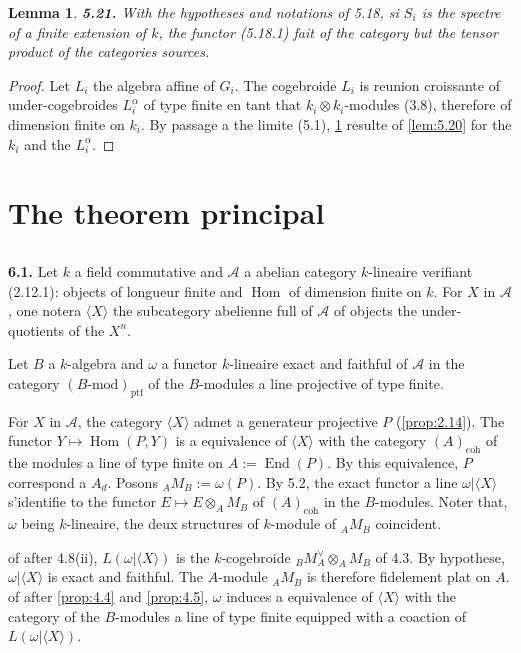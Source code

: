 \documentclass[12pt,a4paper]{article}
\theoremstyle{plain}
\newtheorem{lemma}[theorem]{Lemma}
\theoremstyle{definition}
\theoremstyle{remark}
\DeclareMathOperator{\Hom}{Hom}
\DeclareMathOperator{\End}{End}
\begin{document}
\begin{lemma}\label{lem:5.21}
\textbf{5.21.} With the hypotheses and notations of 5.18, si $S_i$ is the spectre of a finite extension of $k$, the functor (5.18.1) fait of the category but the tensor product of the categories sources.
\end{lemma}

\begin{proof}
Let $L_i$ the algebra affine of $G_i$. The cogebroide $L_i$ is reunion croissante of under-cogebroides $L_i^\alpha$ of type finite en tant that $k_i \otimes k_i$-modules (3.8), therefore of dimension finite on $k_i$. By passage a the limite (5.1), \ref{lem:5.21} resulte of \ref{lem:5.20} for the $k_i$ and the $L_i^\alpha$.
\end{proof}


\section{The theorem principal}

\subsection{}

\textbf{6.1.} Let $k$ a field commutative and $\mathcal{A}$ a abelian category $k$-lineaire verifiant (2.12.1): objects of longueur finite and $\Hom$ of dimension finite on $k$. For $X$ in $\mathcal{A}$, one notera $\langle X \rangle$ the subcategory abelienne full of $\mathcal{A}$ of objects the under-quotients of the $X^n$.

Let $B$ a $k$-algebra and $\omega$ a functor $k$-lineaire exact and faithful of $\mathcal{A}$ in the category $(B\text{-mod})_\mathrm{ptf}$ of the $B$-modules a line projective of type finite.

For $X$ in $\mathcal{A}$, the category $\langle X \rangle$ admet a generateur projective $P$ (\ref{prop:2.14}). The functor $Y \mapsto \Hom(P,Y)$ is a equivalence of $\langle X \rangle$ with the category $(A)_\mathrm{coh}$ of the modules a line of type finite on $A := \End(P)$. By this equivalence, $P$ correspond a $A_d$. Posons ${}_A M_B := \omega(P)$. By 5.2, the exact functor a line $\omega|\langle X \rangle$ s'identifie to the functor $E \mapsto E \otimes_A M_B$ of $(A)_\mathrm{coh}$ in the $B$-modules. Noter that, $\omega$ being $k$-lineaire, the deux structures of $k$-module of ${}_A M_B$ coincident.

of after 4.8(ii), $L(\omega|\langle X \rangle)$ is the $k$-cogebroide ${}_B M_A^\vee \otimes_A M_B$ of 4.3. By hypothese, $\omega|\langle X \rangle$ is exact and faithful. The $A$-module ${}_A M_B$ is therefore fidelement plat on $A$. of after \ref{prop:4.4} and \ref{prop:4.5}, $\omega$ induces a equivalence of $\langle X \rangle$ with the category of the $B$-modules a line of type finite equipped with a coaction of $L(\omega|\langle X \rangle)$.
\end{document}

